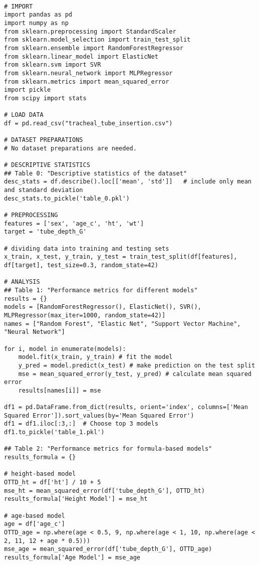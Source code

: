 \documentclass[11pt]{article}
\begin{document}
\begin{verbatim}

# IMPORT
import pandas as pd
import numpy as np
from sklearn.preprocessing import StandardScaler
from sklearn.model_selection import train_test_split
from sklearn.ensemble import RandomForestRegressor
from sklearn.linear_model import ElasticNet
from sklearn.svm import SVR
from sklearn.neural_network import MLPRegressor
from sklearn.metrics import mean_squared_error
import pickle
from scipy import stats

# LOAD DATA
df = pd.read_csv("tracheal_tube_insertion.csv")

# DATASET PREPARATIONS
# No dataset preparations are needed.

# DESCRIPTIVE STATISTICS
## Table 0: "Descriptive statistics of the dataset"
desc_stats = df.describe().loc[['mean', 'std']]   # include only mean and standard deviation
desc_stats.to_pickle('table_0.pkl')

# PREPROCESSING 
features = ['sex', 'age_c', 'ht', 'wt']
target = 'tube_depth_G'

# dividing data into training and testing sets
x_train, x_test, y_train, y_test = train_test_split(df[features], df[target], test_size=0.3, random_state=42)

# ANALYSIS
## Table 1: "Performance metrics for different models"
results = {}
models = [RandomForestRegressor(), ElasticNet(), SVR(), MLPRegressor(max_iter=1000, random_state=42)]
names = ["Random Forest", "Elastic Net", "Support Vector Machine", "Neural Network"]

for i, model in enumerate(models):
    model.fit(x_train, y_train) # fit the model
    y_pred = model.predict(x_test) # make prediction on the test split
    mse = mean_squared_error(y_test, y_pred) # calculate mean squared error
    results[names[i]] = mse

df1 = pd.DataFrame.from_dict(results, orient='index', columns=['Mean Squared Error']).sort_values(by='Mean Squared Error')
df1 = df1.iloc[:3,:]  # Choose top 3 models
df1.to_pickle('table_1.pkl')

## Table 2: "Performance metrics for formula-based models"
results_formula = {}

# height-based model
OTTD_ht = df['ht'] / 10 + 5
mse_ht = mean_squared_error(df['tube_depth_G'], OTTD_ht)
results_formula['Height Model'] = mse_ht

# age-based model
age = df['age_c']
OTTD_age = np.where(age < 0.5, 9, np.where(age < 1, 10, np.where(age < 2, 11, 12 + age * 0.5)))
mse_age = mean_squared_error(df['tube_depth_G'], OTTD_age)
results_formula['Age Model'] = mse_age


\end{verbatim}
\end{document}
